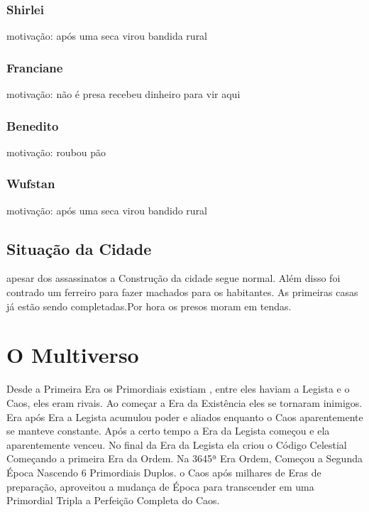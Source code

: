 \subsection{Shirlei}
motivação: após uma seca virou bandida rural 
\subsection{Franciane}
motivação: não é presa recebeu dinheiro para vir aqui
\subsection{Benedito}
motivação: roubou pão
\subsection{Wufstan}
motivação: após uma seca virou bandido rural 
\section{Situação da Cidade}
apesar dos assassinatos a Construção da cidade segue normal.
Além disso foi contrado um ferreiro para fazer machados para os habitantes.
As primeiras casas já estão sendo completadas.Por hora os presos moram em tendas.

\chapter{O Multiverso}
Desde a Primeira Era os Primordiais existiam , entre eles haviam a Legista e o Caos, eles eram rivais.
Ao começar a Era da Existência eles se tornaram inimigos.
Era após Era a Legista acumulou poder e aliados enquanto o Caos aparentemente se manteve constante.
Após a certo tempo a Era da Legista começou e ela aparentemente venceu. 
No final da Era da Legista ela criou o Código Celestial Começando a primeira Era da Ordem.
Na 3645ª Era Ordem, Começou a Segunda Época Nascendo 6 Primordiais Duplos. 
o Caos após milhares de Eras de preparação, aproveitou a mudança de Época para
transcender em uma Primordial Tripla a Perfeição Completa do Caos.

